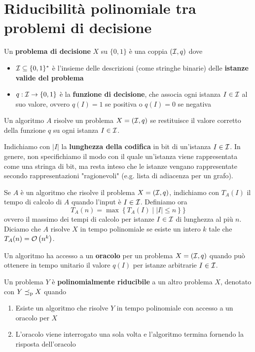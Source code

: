 \section{Riducibilità polinomiale tra problemi di decisione}

Un \textbf{problema di decisione} $X$ su $\{0,1\}$ è una coppia $(\mathcal{I}, q)$ dove
\begin{itemize}
    \item $\mathcal{I} \subseteq \{0,1\}^\ast$ è l'insieme delle descrizioni (come stringhe binarie) delle \textbf{istanze valide del problema}

    \item $q: \mathcal{I} \rightarrow \{0,1\}$ è la \textbf{funzione di decisione}, che associa ogni istanza $I \in \mathcal{I}$ al suo valore,  ovvero $q(I) = 1$ se positiva o $q(I) = 0$ se negativa
\end{itemize}

Un algoritmo $A$ risolve un problema $X = (\mathcal{I}, q)$ se restituisce il valore corretto della funzione $q$ su ogni istanza $I \in \mathcal{I}$.

Indichiamo con $|I|$ la \textbf{lunghezza della codifica} in bit di un'istanza $I \in \mathcal{I}$. In genere, non specifichiamo il modo con il quale un'istanza viene rappresentata come una stringa di bit, ma resta inteso che le istanze vengano rappresentate secondo rappresentazioni "ragionevoli" (e.g. lista di adiacenza per un grafo).

Se $A$ è un algoritmo che risolve il problema $X = (\mathcal{I}, q)$, indichiamo con $T_A (I)$ il tempo di calcolo di $A$ quando l'input è $I \in \mathcal{I}$. Definiamo ora
$$ T_A (n) = \max \left\{T_A (I) \mid |I| \leq n \right\}\}$$
ovvero il massimo dei tempi di calcolo per istanze $I \in \mathcal{I}$ di lunghezza al più $n$. Diciamo che $A$ risolve $X$ in tempo polinomiale se esiste un intero $k$ tale che $T_A(n) = \mathcal{O} \left(n^k\right)$.

Un algoritmo ha accesso a un \textbf{oracolo} per un problema $X = (\mathcal{I}, q)$ quando può ottenere in tempo unitario il valore $q(I)$ per istanze arbitrarie $I \in \mathcal{I}$.

Un problema $Y$ è \textbf{polinomialmente riducibile} a un altro problema $X$, denotato con $Y \preceq_\text{p} X$ quando
\begin{enumerate}
    \item Esiste un algoritmo che risolve $Y$ in tempo polinomiale con accesso a un oracolo per $X$

    \item L'oracolo viene interrogato una sola volta e l'algoritmo termina fornendo la risposta dell'oracolo
\end{enumerate}

